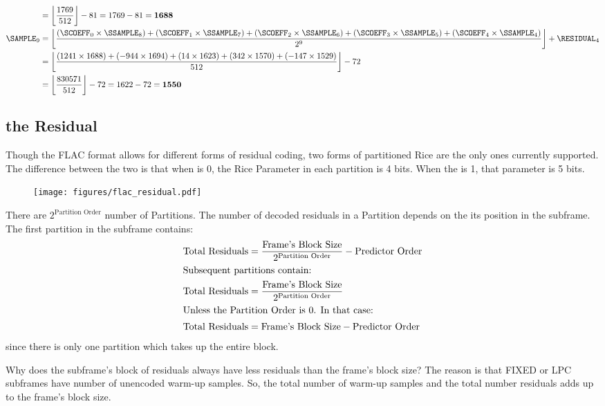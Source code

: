 \begin{align*}
&= \left\lfloor \frac{1769}{512} \right\rfloor - 81 = 1769 - 81 = \textbf{1688} \\
\SAMPLE_9 &= \left\lfloor \frac{(\SCOEFF_0 \times \SSAMPLE_8) + (\SCOEFF_1 \times \SSAMPLE_7) + (\SCOEFF_2 \times \SSAMPLE_6) + (\SCOEFF_3 \times \SSAMPLE_5) + (\SCOEFF_4 \times \SSAMPLE_4)}{2 ^ 9}\right\rfloor + \RESIDUAL_4 \\
&= \left\lfloor \frac{(1241 \times 1688) + (-944 \times 1694) + (14 \times 1623) + (342 \times 1570) + (-147 \times 1529)}{512}\right\rfloor - 72 \\
&= \left\lfloor \frac{830571}{512} \right\rfloor - 72 = 1622 - 72 = \textbf{1550} \\
\end{align*}

\clearpage

\subsection{the Residual}
\label{flac_residual}
Though the FLAC format allows for different forms of
residual coding, two forms of partitioned Rice are the only ones
currently supported.
The difference between the two is that when  is 0,
the Rice Parameter in each partition is 4 bits.
When the  is 1, that parameter is 5 bits.
\begin{figure}[h]
\texttt{[image: figures/flac\_residual.pdf]}
\end{figure}
\par
\noindent

There are $2 ^ \text{Partition Order}$ number of Partitions.
The number of decoded residuals in a Partition depends on the
its position in the subframe.
The first partition in the subframe contains:
\begin{align*}
\text{Total Residuals} &= \frac{\text{Frame's Block Size}}{2 ^ {\text{Partition Order}}} - \text{Predictor Order} \\
\intertext{Subsequent partitions contain:}
\text{Total Residuals} &= \frac{\text{Frame's Block Size}}{2 ^ {\text{Partition Order}}} \\
\intertext{Unless the Partition Order is 0.  In that case:}
\text{Total Residuals} &= \text{Frame's Block Size} - \text{Predictor Order}
\end{align*}
\noindent
since there is only one partition which takes up the entire block.

Why does the subframe's block of residuals always have 
less residuals than the frame's block size?
The reason is that FIXED or LPC subframes have 
number of unencoded warm-up samples.
So, the total number of warm-up samples and the total number residuals
adds up to the frame's block size.

